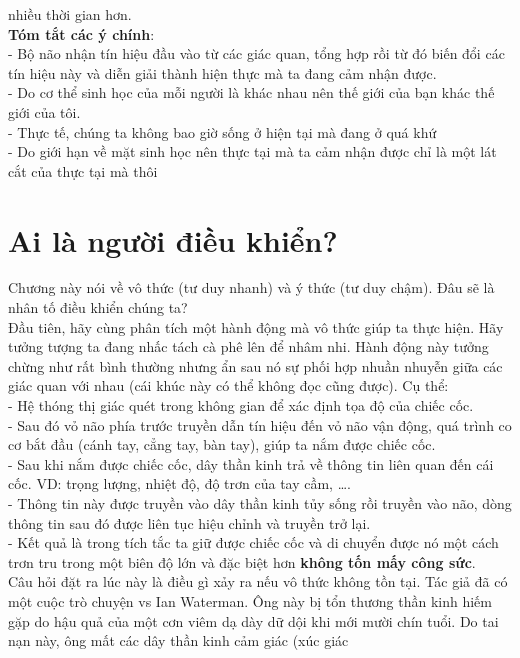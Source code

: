\documentclass{article}
\newcommand\tab[1][1cm]{\hspace*{#1}}
\begin{document}
 nhiều thời gian hơn.\\
 \tab \textbf{Tóm tắt các ý chính}: \\
\tab\tab - Bộ não nhận tín hiệu đầu vào từ các giác quan, tổng hợp rồi từ đó biến đổi các tín hiệu này 
và diễn giải thành hiện thực mà ta đang cảm nhận được.\\
\tab\tab - Do cơ thể sinh học của mỗi người là khác nhau nên thế giới của bạn khác thế giới của tôi.\\
\tab\tab - Thực tế, chúng ta không bao giờ sống ở hiện tại mà đang ở quá khứ\\
\tab\tab - Do giới hạn về mặt sinh học nên thực tại mà ta cảm nhận được chỉ là một
lát cắt của thực tại mà thôi\\


\section{Ai là người điều khiển?}
\tab Chương này nói về vô thức (tư duy nhanh) và ý thức (tư duy chậm). Đâu sẽ là nhân tố 
điều khiển chúng ta? \\
\tab Đầu tiên, hãy cùng phân tích một hành động mà vô thức giúp ta thực hiện. Hãy tưởng tượng
ta đang nhấc tách cà phê lên để nhâm nhi. Hành động này tưởng chừng như rất bình thường nhưng 
ẩn sau nó sự phối hợp nhuần nhuyễn giữa các giác quan với nhau (cái khúc này có thể không đọc
cũng được). Cụ thể:\\
\tab - Hệ thóng thị giác quét trong không gian để xác định tọa độ của chiếc cốc.\\
\tab - Sau đó vỏ não phía trước truyền dẫn tín hiệu đến vỏ não vận động, quá trình co cơ 
bắt đầu (cánh tay, cẳng tay, bàn tay), giúp ta nắm được chiếc cốc.\\
\tab - Sau khi nắm được chiếc cốc, dây thần kinh trả về thông tin liên quan đến cái cốc. VD: 
trọng lượng, nhiệt độ, độ trơn của tay cầm, \dots.\\
\tab - Thông tin này được truyền vào dây thần kinh tủy sống rồi truyền vào não, dòng thông tin 
sau đó được liên tục hiệu chỉnh và truyền trở lại.\\
\tab - Kết quả là trong tích tắc ta giữ được chiếc cốc và di chuyển được nó một cách trơn tru
trong một biên độ lớn và đặc biệt hơn \textbf{không tốn mấy công sức}.\\
\tab Câu hỏi đặt ra lúc này là điều gì xảy ra nếu vô thức không tồn tại. Tác giả đã có một cuộc
trò chuyện vs Ian Waterman. Ông này bị tổn thương thần kinh hiếm gặp do hậu quả của một cơn viêm
dạ dày dữ dội khi mới mười chín tuổi. Do tai nạn này, ông mất các dây thần kinh cảm giác (xúc giác
\end{document}
